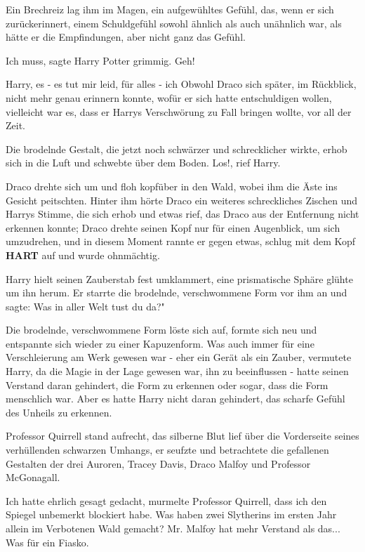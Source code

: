 Ein Brechreiz lag ihm im Magen, ein aufgewühltes Gefühl, das, wenn er sich
zurückerinnert, einem Schuldgefühl sowohl ähnlich als auch unähnlich war,
als hätte er die Empfindungen, aber nicht ganz das Gefühl.

\glqq{}Ich muss\grqq{}, sagte Harry Potter grimmig. \glqq{}Geh!\grqq{}

\glqq{}Harry, es - es tut mir leid, für alles - ich\grqq{} Obwohl Draco sich
später, im Rückblick, nicht mehr genau erinnern konnte, wofür er sich
hatte entschuldigen wollen, vielleicht war es, dass er Harrys
Verschwörung zu Fall bringen wollte, vor all der Zeit.

Die brodelnde Gestalt, die jetzt noch schwärzer und schrecklicher wirkte, erhob
sich in die Luft und schwebte über dem Boden. \glqq{}Los!\grqq{}, rief
Harry.

Draco drehte sich um und floh kopfüber in den Wald, wobei ihm die Äste ins
Gesicht peitschten. Hinter ihm hörte Draco ein weiteres schreckliches
Zischen und Harrys Stimme, die sich erhob und etwas rief, das Draco aus
der Entfernung nicht erkennen konnte; Draco drehte seinen Kopf nur für
einen Augenblick, um sich umzudrehen, und in diesem Moment rannte er
gegen etwas, schlug mit dem Kopf \textbf{HART} auf und wurde ohnmächtig.

Harry hielt seinen Zauberstab fest umklammert, eine prismatische Sphäre glühte
um ihn herum. Er starrte die brodelnde, verschwommene Form vor ihm an und
sagte: \glqq{}Was in aller Welt tust du da?"

Die brodelnde, verschwommene Form löste sich auf, formte sich neu und entspannte
sich wieder zu einer Kapuzenform. Was auch immer für eine Verschleierung
am Werk gewesen war - eher ein Gerät als ein Zauber, vermutete Harry, da
die Magie in der Lage gewesen war, ihn zu beeinflussen - hatte seinen
Verstand daran gehindert, die Form zu erkennen oder sogar, dass die Form
menschlich war. Aber es hatte Harry nicht daran gehindert, das scharfe
Gefühl des Unheils zu erkennen.

Professor Quirrell stand aufrecht, das silberne Blut lief über die Vorderseite
seines verhüllenden schwarzen Umhangs, er seufzte und betrachtete die
gefallenen Gestalten der drei Auroren, Tracey Davis, Draco Malfoy und
Professor McGonagall.

\glqq{}Ich hatte ehrlich gesagt gedacht\grqq{}, murmelte Professor Quirrell,
\glqq{}dass ich den Spiegel unbemerkt blockiert habe. Was haben zwei
Slytherins im ersten Jahr allein im Verbotenen Wald gemacht? Mr. Malfoy
hat mehr Verstand als das... Was für ein Fiasko.\grqq{}

